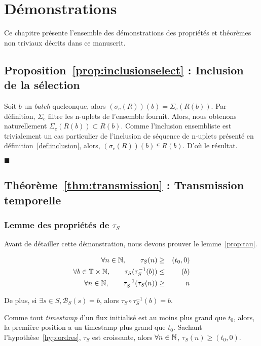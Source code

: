 \chapter{Démonstrations}
\chaptertoc

Ce chapitre présente l'ensemble des démonstrations des propriétés et théorèmes non triviaux décrits dans ce manuscrit.
\def\findemo{\begin{flushright} $\blacksquare$ \end{flushright}}
\section{Proposition~\ref{prop:inclusionselect} : Inclusion de la sélection}
Soit $b$ un \textit{batch} quelconque, alors $(\sigma_c(R))(b) = \Sigma_c(R(b))$. Par définition, $\Sigma_c$ filtre les n-uplets de l'ensemble fournit. Alors, nous obtenons naturellement $\Sigma_c(R(b)) \subset R(b)$. Comme l'inclusion ensembliste est trivialement un cas particulier de l'inclusion de séquence de n-uplets présenté en définition~\ref{def:inclusion}, alors, $(\sigma_c(R))(b) \subseteqq R(b)$. D'où le résultat.
\findemo

\section{Théorème~\ref{thm:transmission} : Transmission temporelle}
\subsection{Lemme des propriétés de $\tau_S$}
Avant de détailler cette démonstration, nous devons prouver le lemme~\ref{prop:tau}.

\begin{lem}\label{prop:tau}
\begin{eqnarray*}
   \forall n \in \mathbb{N}, \qquad \tau_S(n) &\geq&( t_0,0) \\
   \forall b\in \mathbb{T}\times\mathbb{N}, \qquad \tau_S(\tau_S^{-1}(b)) & \leq & (b)\\
	\forall n \in \mathbb{N}, \qquad \tau_S^{-1}(\tau_S(n)) &\geq & n
\end{eqnarray*}

De plus, si $\exists s \in S, \mathcal B_S(s)=b$, alors $\tau_S\circ\tau_S^{-1}(b) = b$.
\end{lem}

Comme tout \textit{timestamp} d'un flux initialisé est au moins plus grand que $t_0$, alors, la première position a un timestamp plus grand que $t_0$. Sachant l'hypothèse~\ref{hyp:ordres}, $\tau_S$ est croissante, alors $\forall n \in \mathbb{N}$, $\tau_S(n) \geq (t_0,0)$.

